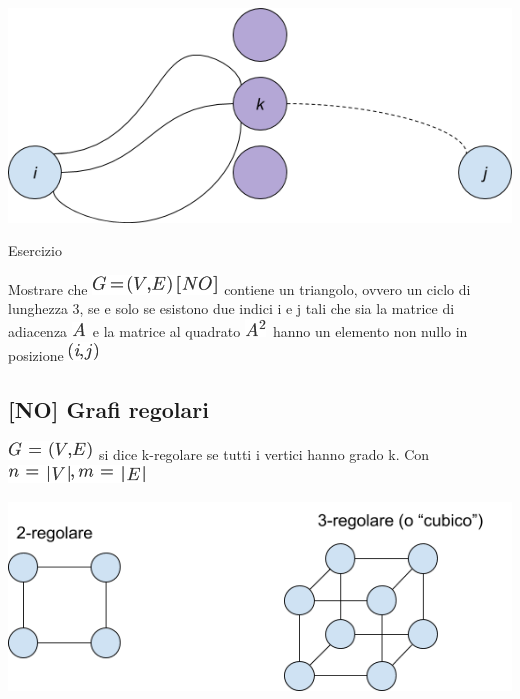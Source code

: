 \documentclass{article}
\begin{document}
{~~~~~~~~~~~~~~~~}{\includegraphics{images/image538.png}}

{}

{Esercizio}

{Mostrare che }\includegraphics{images/image420.png}{~contiene un
}{triangolo}{, ovvero un ciclo di lunghezza 3, se e solo se esistono due
indici i e j tali che sia la matrice di adiacenza
}\includegraphics{images/image73.png}{~e la matrice al quadrato
}\includegraphics{images/image421.png}{~hanno un elemento non nullo in
posizione }\includegraphics{images/image422.png}

{}

\hypertarget{h.m8b6lpkoqj6x}{\subsection{\texorpdfstring{{{[}NO{]} Grafi
regolari}}{{[}NO{]} Grafi regolari}}\label{h.m8b6lpkoqj6x}}

\includegraphics{images/image335.png}{~si dice k-regolare se tutti i
vertici hanno grado k. Con }\includegraphics{images/image423.png}

{}

{\includegraphics{images/image524.png}}
\end{document}
